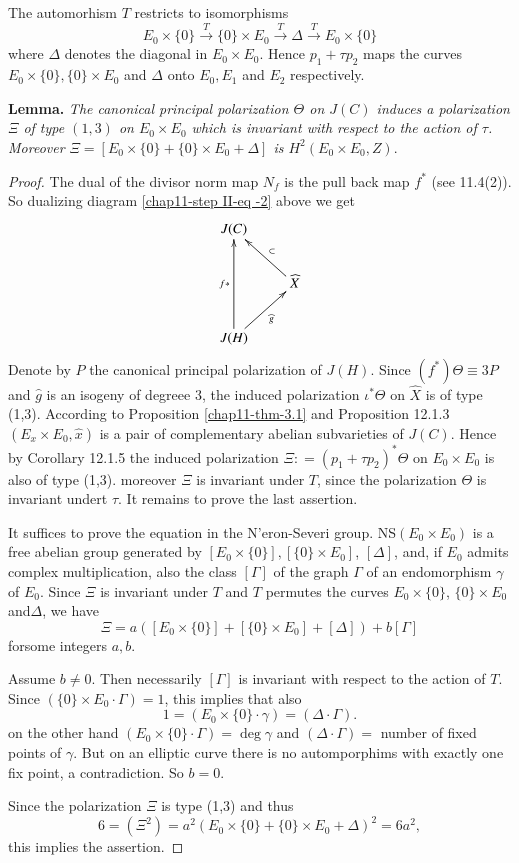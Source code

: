 The automorhism $T$ restricts to isomorphisms
$$
E_{0} \times \{0\} \xrightarrow{T}\{0\} \times E_{0} \xrightarrow{T}\Delta\xrightarrow{T} E_{0} \times \{0\}
$$ 
where $\Delta$ denotes the diagonal in $E_{0}\times E_{0}$. Hence $p_{1} + \tau p_{2}$ maps the curves $E_{0}\times \{0\}, \{0\} \times E_{0}$ and $\Delta$ onto $E_{0}, E_{1}$ and $E_{2}$ respectively.

\medskip
\noindent
{\bfseries {} Lemma.\label{chap11-lemma-5.4}} \textit{The canonical principal polarization $\Theta$ on $J(C)$ induces a polarization $\Xi$ of type $(1,3)$ on $E_{0} \times E_{0}$ which is invariant with respect to the action of $\tau$.
 Moreover $\Xi =[E_{0}\times \{0\} + \{0\} \times E_{0}+ \Delta]$ is $H^{2}(E_{0}\times E_{0}, Z)$}.

\begin{proof}
The dual of the divisor norm map $N_{f}$ is the pull back map $f^{*}$
(see \cite{chap11-keyL-B} 11.4(2)). So dualizing diagram \eqref{chap11-step II-eq -2} above we get
$$
\xymatrix{
J(C) & \\
    &\widehat{X} \ar[ul]_-{\subset}\\
J(H) \ar[ur]_-{\widehat{g}}\ar[uu]^-{f*} &     
}
$$
Denote by $P$ the canonical principal polarization of $J(H)$. Since $(f^{*}) \Theta \equiv 3P$ and $\widehat{g}$ is an isogeny of degreee 3, the induced polarization $\iota^{*}\Theta$ on $\widehat{X}$ is of type (1,3). According to Proposition \ref{chap11-thm-3.1} and \cite{chap11-keyL-B} Proposition 12.1.3 $(E_{x} \times E_{0}, \widehat{x})$ is a pair of complementary abelian subvarieties of $J(C)$. Hence by \cite{chap11-keyL-B} Corollary 12.1.5 the induced polarization
$\Xi : = (p_{1} + \tau p_{2})^{*}\Theta$ on $E_{0} \times E_{0}$ is also of type (1,3). moreover $\Xi$ is invariant under $T$, since the polarization $\Theta$ is invariant undert $\tau$. It remains to prove the last assertion.

It suffices to prove the equation in the N'eron-Severi group. NS$(E_{0}\times E_{0})$ is a free abelian group generated by $[E_{0} \times \{0\}],[\{0\} \times E_{0}]$, $[\Delta]$, and, if $E_{0}$ admits complex multiplication, also the class $[\Gamma]$  of the graph $\Gamma$ of an endomorphism $\gamma$ of $E_{0}$. Since $\Xi$ is invariant under $T$ and $T$ permutes the curves $E_{0} \times \{0\}$, $\{0\}\times E_{0}$ and$ \Delta$, we have
$$
\Xi = a([E_{0} \times \{0\}] + [\{0\} \times E_{0}] + [\Delta]) +b[\Gamma]
$$
for\pageoriginale some integers $a,b$.

Assume $b\neq 0$. Then necessarily $[\Gamma]$ is invariant with respect to the action of $T$. Since $(\{0\} \times E_{0}\cdot \Gamma)=1$, this implies that also
$$
1 =(E_{0}\times \{0\}\cdot \gamma)=(\Delta \cdot \Gamma).
$$
on the other hand $(E_{0} \times \{0\}\cdot \Gamma)=\deg \gamma$ and  $(\Delta \cdot \Gamma)=$ number of fixed points of $\gamma$. But on an elliptic curve there is no automporphims with exactly one fix point, a contradiction. So $b=0$.

Since the polarization $\Xi$ is type (1,3) and thus
$$
6 = (\Xi^{2}) =a^{2}(E_{0}\times \{0\} + \{0\} \times E_{0} + \Delta)^{2}=6a^{2},
$$
this implies the assertion.
\end{proof}

